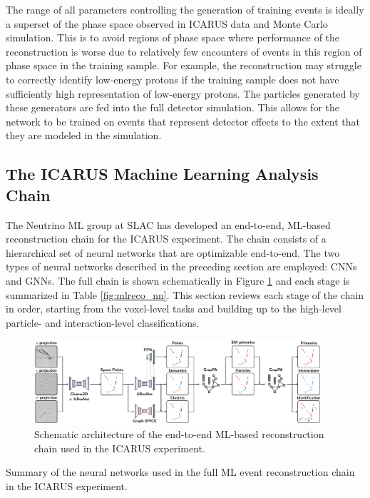 The range of all parameters controlling the generation of training events is ideally a superset of the phase space observed in ICARUS data and Monte Carlo simulation. This is to avoid regions of phase space where performance of the reconstruction is worse due to relatively few encounters of events in this region of phase space in the training sample. For example, the reconstruction may struggle to correctly identify low-energy protons if the training sample does not have sufficiently high representation of low-energy protons. The particles generated by these generators are fed into the full detector simulation. This allows for the network to be trained on events that represent detector effects to the extent that they are modeled in the simulation.

\subsection{The ICARUS Machine Learning Analysis Chain}
\label{sec:ml_full_chain}

The Neutrino ML group at SLAC has developed an end-to-end, ML-based reconstruction chain for the ICARUS experiment. The chain consists of a hierarchical set of neural networks that are optimizable end-to-end. The two types of neural networks described in the preceding section are employed: CNNs and GNNs. The full chain is shown schematically in Figure \ref{fig:mlreco_schematic} and each stage is summarized in Table \ref{fig:mlreco_nn}. This section reviews each stage of the chain in order, starting from the voxel-level tasks and building up to the high-level particle- and interaction-level classifications. 

\begin{figure}
    \centering
    \includegraphics[width=0.95\textwidth]{figures/mlreco/mlreco_schematic.pdf}
    \caption{Schematic architecture of the end-to-end ML-based reconstruction chain used in the ICARUS experiment.}
    \label{fig:mlreco_schematic}
\end{figure}

\begin{table}
    \centering
    \caption{Summary of the neural networks used in the full ML event reconstruction chain in the ICARUS experiment.}
    \scalebox{0.8}{}
    \label{fig:mlreco_nn}
\end{table}


